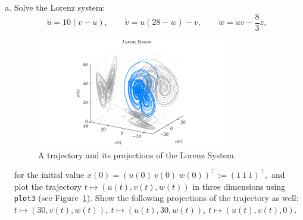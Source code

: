 \documentclass[a4paper, fleqn, 10pt]{report}
\theoremstyle{definition}
\newcommand{\mc}[1]{{\color{Blue}\tt #1}}
\begin{document}
\begin{enumerate}[a)]
\item Solve the Lorenz system:
	\begin{equation}
	    \dot u = 10(v-u),\qquad
	    \dot v = u(28-w)-v,\qquad
	    \dot w = uv - \frac{8}{3}z,\label{eq:lorenz}
	\end{equation}
	\begin{figure}[ht!]
	\centering
	 \includegraphics[width=0.8\textwidth]{lorenz}
	 \caption{A trajectory and its projections of the Lorenz System.}\label{fig:lorenz}
	\end{figure}

      for the initial value $x(0) = (u(0)\ v(0)\ w(0))^\top := (1\ 1\ 1)^\top,$
      and plot the  trajectory $t\mapsto (u(t), v(t), w(t))$ in three dimensions using \mc{plot3} (see Figure~\ref{fig:lorenz}).
      Show the following projections of the trajectory as well: $t\mapsto (30, v(t), w(t)),\: t\mapsto (u(t), 30, w(t)),\: t\mapsto (u(t), v(t), 0).$
\end{enumerate}
\end{document}
